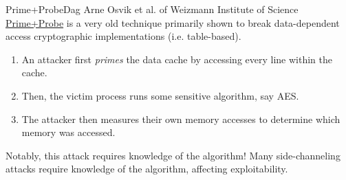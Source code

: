 \begin{frame}{Prime+Probe}{Dag Arne Osvik et al. of Weizmann Institute of Science}
    \label{prime+probe}
    \href{https://cs-people.bu.edu/tromer/papers/cache.pdf}{\color{pink}Prime+Probe} is a very old technique primarily shown to break data-dependent access cryptographic implementations (i.e. table-based). 
    \begin{enumerate}
        \item An attacker first \textit{primes} the data cache by accessing every line within the cache. 
        \item Then, the victim process runs some sensitive algorithm, say AES.
        \item The attacker then measures their own memory accesses to determine which memory was accessed.
    \end{enumerate}
    Notably, this attack requires knowledge of the algorithm! Many side-channeling attacks require knowledge of the algorithm, affecting exploitability. 
\end{frame}

